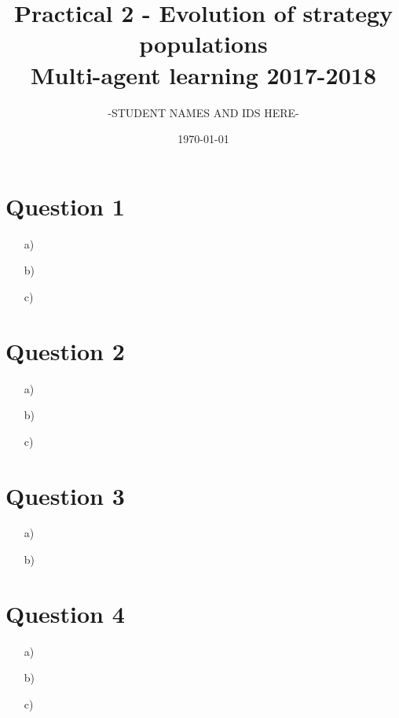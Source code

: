 \documentclass[12pt]{article}
\title{Practical 2 - Evolution of strategy populations\\
	\large Multi-agent learning 2017-2018}
\author{-STUDENT NAMES AND IDS HERE-}
\date{\today}
\begin{document}
\maketitle

\section*{Question 1}

\begin{enumerate}
	\item[a)]
	\item[b)]
	\item[c)]
\end{enumerate}

\section*{Question 2}

\begin{enumerate}
	\item[a)]
	\item[b)]
	\item[c)]
\end{enumerate}

\section*{Question 3}

\begin{enumerate}
	\item[a)]
	\item[b)]
\end{enumerate}

\section*{Question 4}

\begin{enumerate}
	\item[a)]
	\item[b)]
	\item[c)]
\end{enumerate}
\end{document}
